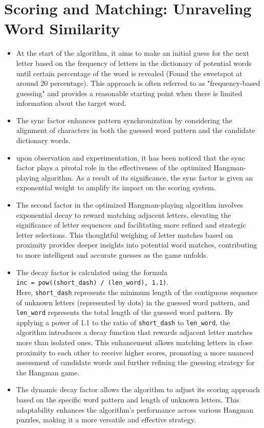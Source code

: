 \documentclass[titlepage, 11pt]{article}
\begin{document}
\section{Scoring and Matching: Unraveling Word Similarity}
\begin{itemize}
        \item At the start of the algorithm, it aims to make an initial guess for the next letter based on the frequency of letters in the dictionary of potential words until certain percentage of the word is revealed (Found the sweetspot at around 20 percentage). This approach is often referred to as "frequency-based guessing" and provides a reasonable starting point when there is limited information about the target word.
        \item The sync factor enhances pattern synchronization by considering the alignment of characters in both the guessed word pattern and the candidate dictionary words.
        \item upon observation and experimentation, it has been noticed that the sync factor plays a pivotal role in the effectiveness of the optimized Hangman-playing algorithm. As a result of its significance, the sync factor is given an exponential weight to amplify its impact on the scoring system.
        \item The second factor in the optimized Hangman-playing algorithm involves exponential decay to reward matching adjacent letters, elevating the significance of letter sequences and facilitating more refined and strategic letter selections. This thoughtful weighing of letter matches based on proximity provides deeper insights into potential word matches, contributing to more intelligent and accurate guesses as the game unfolds.
        \item The decay factor is calculated using the formula \\ \texttt{inc = pow((short\_dash) / (len\_word), 1.1)}.
        \\
        Here, \texttt{short\_dash} represents the minimum length of the contiguous sequence of unknown letters (represented by dots) in the guessed word pattern, and \texttt{len\_word} represents the total length of the guessed word pattern. By applying a power of 1.1 to the ratio of \texttt{short\_dash} to \texttt{len\_word}, the algorithm introduces a decay function that rewards adjacent letter matches more than isolated ones. This enhancement allows matching letters in close proximity to each other to receive higher scores, promoting a more nuanced assessment of candidate words and further refining the guessing strategy for the Hangman game.
        \item The dynamic decay factor allows the algorithm to adjust its scoring approach based on the specific word pattern and length of unknown letters. This adaptability enhances the algorithm's performance across various Hangman puzzles, making it a more versatile and effective strategy.
\end{itemize}
\end{document}
